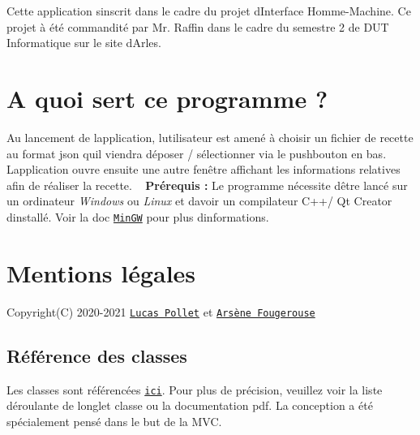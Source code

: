 Cette application s\textquotesingle{}inscrit dans le cadre du projet d\textquotesingle{}Interface Homme-\/\+Machine. Ce projet à été commandité par Mr. Raffin dans le cadre du semestre 2 de D\+UT Informatique sur le site d\textquotesingle{}Arles.\hypertarget{index_utilite}{}\section{A quoi sert ce programme ?}\label{index_utilite}
Au lancement de l\textquotesingle{}application, l\textquotesingle{}utilisateur est amené à choisir un fichier de recette au format json qu\textquotesingle{}il viendra déposer / sélectionner via le pushbouton en bas.~\newline
 L\textquotesingle{}application ouvre ensuite une autre fenêtre affichant les informations relatives afin de réaliser la recette. ~\newline
 {\bfseries Prérequis \+:} Le programme nécessite d\textquotesingle{}être lancé sur un ordinateur {\itshape Windows} ou {\itshape Linux} et d\textquotesingle{}avoir un compilateur C++/ Qt Creator d\textquotesingle{}installé. Voir la doc \href{http://www.mingw.org}{\tt Min\+GW} pour plus d\textquotesingle{}informations.\hypertarget{index_mentions}{}\section{Mentions légales}\label{index_mentions}
Copyright(\+C) 2020-\/2021 \href{ mailto: lucas.pollet@etu.univ-amu.fr}{\tt Lucas Pollet} et \href{ mailto: arsene.fougerouse@etu.univ-amu.fr}{\tt Arsène Fougerouse}\hypertarget{index_references}{}\subsection{Référence des classes}\label{index_references}
Les classes sont référencées \href{file:///home/gridexx/projet-recette-json/doc/html/annotated.html}{\tt ici}. Pour plus de précision, veuillez voir la liste déroulante de l\textquotesingle{}onglet classe ou la documentation pdf. La conception a été spécialement pensé dans le but de la M\+VC. 